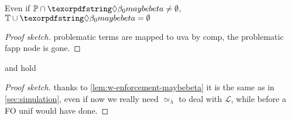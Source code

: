 \documentclass[sigconf,natbib=false,review]{acmart}
\newcommand{\UnifRel}{\ensuremath{\simeq}}
\newcommand{\Uo}{\texorpdfstring{\ensuremath{\UnifRel_o}\xspace}{unif\_o}}
\newcommand{\Ue}{\ensuremath{\UnifRel_\lambda}\xspace}
\newcommand{\llambda}{\ensuremath{\mathcal{L}}\xspace}
\newcommand{\foUnifPb}{\ensuremath{\mathbb{P}}\xspace}
\newcommand{\hoUnifPb}{\ensuremath{\mathbb{T}}\xspace}
\begin{document}
\begin{lemma}\label{lem:w-enforcement-maybebeta} Even if $\foUnifPb \cap \maybebeta \ne \emptyset$,
  $\hoUnifPb \cup \maybebeta = \emptyset$
\end{lemma}
\begin{proof}[Proof sketch]
  problematic terms are mapped to uva by comp, the problematic fapp node is gone.
\end{proof}

\begin{theorem}  and
 hold
\end{theorem}
\begin{proof}[Proof sketch] thanks to \cref{lem:w-enforcement-maybebeta}
  it is the same as in \cref{sec:simulation}, even if now
  we really need \Ue{} to deal with \llambda, while before a FO unif
  would have done.
\end{proof}





\end{document}
